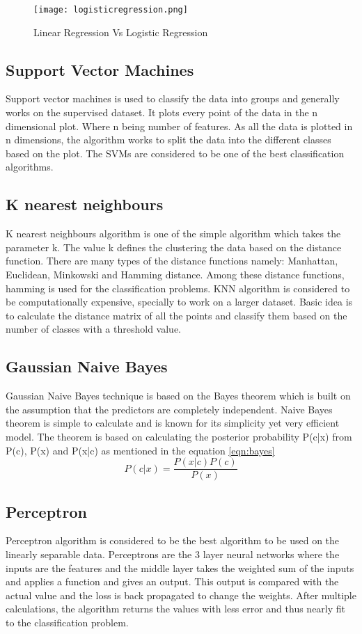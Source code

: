\begin{figure}[h!]
	\center\texttt{[image: logisticregression.png]}
	\caption{Linear Regression Vs Logistic Regression \cite{logistic}}
	\label{fig:logisticregression}
\end{figure}
 
\subsection{Support Vector Machines}
Support vector machines is used to classify the data into groups and generally works on the supervised dataset. It plots every point of the data in the n  dimensional plot. Where n being number of features. As all the data is plotted in n dimensions, the algorithm works to split the data into the different classes based on the plot. The SVMs are considered to be one of the best classification algorithms.

\subsection{K nearest neighbours}
K nearest neighbours algorithm is one of the simple algorithm which takes the parameter k. The value k defines the clustering the data based on the distance function. There are many types of the distance functions namely: Manhattan, Euclidean, Minkowski and Hamming distance. Among these distance functions, hamming is used for the classification problems. KNN algorithm is considered to be computationally expensive, specially to work on a larger dataset. Basic idea is to calculate the distance matrix of all the points and classify them based on the number of classes with a threshold value.

\subsection{Gaussian Naive Bayes}
Gaussian Naive Bayes technique is based on the Bayes theorem which is built on the assumption that the predictors are completely independent. Naive Bayes theorem is simple to calculate and is known for its simplicity yet very efficient model. The theorem is based on calculating the posterior probability P(c|x) from P(c), P(x) and P(x|c) as mentioned in the equation \ref{eqn:bayes}
 \begin{equation}\label{eqn:bayes}
    P(c|x) = \frac {P(x|c) P(c)} {P(x)}
 \end{equation}

\subsection{Perceptron}
Perceptron algorithm is considered to be the best algorithm to be used on the linearly separable data. Perceptrons are the 3 layer neural networks where the inputs are the features and the middle layer takes the weighted sum of the inputs and applies a function and gives an output. This output is compared with the actual value and the loss is back propagated to change the weights. After multiple calculations, the algorithm returns the values with less error and thus nearly fit to the classification problem.

